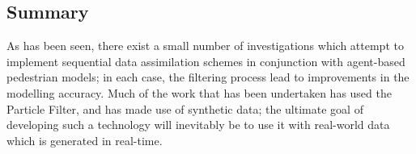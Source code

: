 



\subsection{Summary}\label{sub:lit_rev:summary}



As has been seen, there exist a small number of investigations which attempt to
implement sequential data assimilation schemes in conjunction with agent-based
pedestrian models; in each case, the filtering process lead to improvements in
the modelling accuracy.
Much of the work that has been undertaken has used the Particle Filter, and has
made use of synthetic data; the ultimate goal of developing such a technology
will inevitably be to use it with real-world data which is generated in
real-time.

